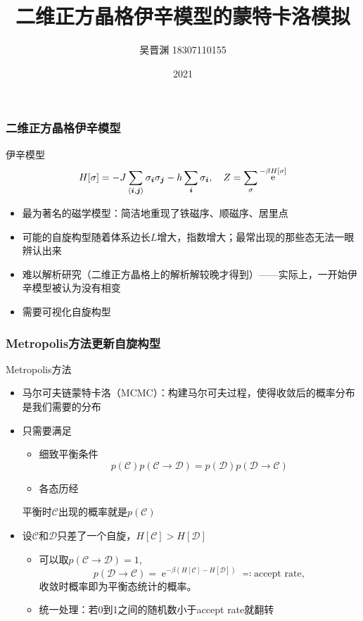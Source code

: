 \documentclass[UTF8]{ctexbeamer}
\title{二维正方晶格伊辛模型的蒙特卡洛模拟}
\author{吴晋渊 18307110155}
\institute{复旦大学物理学系}
\date{2021}
\DeclareMathOperator{\ee}{e}
\begin{document}
\frame{\titlepage}

\begin{frame}
\frametitle{二维正方晶格伊辛模型}

伊辛模型
\begin{equation}
    H[\sigma] = - J \sum_{\langle \vb*{i}, \vb*{j} \rangle} \sigma_{\vb*{i}} \sigma_{\vb*{j}} - h \sum_{\vb*{i}} \sigma_{\vb*{i}}, \quad Z = \sum_\sigma \ee^{- \beta H[\sigma]}
\end{equation}    
\begin{itemize}
    \item 最为著名的磁学模型：简洁地重现了铁磁序、顺磁序、居里点
    \item 可能的自旋构型随着体系边长$L$增大，指数增大；最常出现的那些态无法一眼辨认出来
    \item 难以解析研究（二维正方晶格上的解析解较晚才得到）——实际上，一开始伊辛模型被认为没有相变
    \item 需要可视化自旋构型
\end{itemize}

\end{frame}

\begin{frame}
\frametitle{Metropolis方法更新自旋构型}

Metropolis方法
\begin{itemize}
    \item 马尔可夫链蒙特卡洛（MCMC）：构建马尔可夫过程，使得收敛后的概率分布是我们需要的分布
    \item 只需要满足   
    \begin{itemize}
        \item 细致平衡条件
        \begin{equation}
            p(\mathcal{C}) p(\mathcal{C} \to \mathcal{D}) = p(\mathcal{D}) p(\mathcal{D} \to \mathcal{C})
        \end{equation} 
        \item 各态历经
    \end{itemize}
    平衡时$\mathcal{C}$出现的概率就是$p(\mathcal{C})$
    \item 设$\mathcal{C}$和$\mathcal{D}$只差了一个自旋，$H[\mathcal{C}] > H[\mathcal{D}]$
    \begin{itemize}
        \item 可以取$p(\mathcal{C} \to \mathcal{D}) = 1$, 
        \begin{equation}
            p(\mathcal{D} \to \mathcal{C}) = \ee^{- \beta (H[\mathcal{C}] - H[\mathcal{D}])} \eqcolon \text{accept rate},
        \end{equation}
        收敛时概率即为平衡态统计的概率。
        \item 统一处理：若0到1之间的随机数小于accept rate就翻转
    \end{itemize} 
\end{itemize}
\end{frame}
\end{document}
